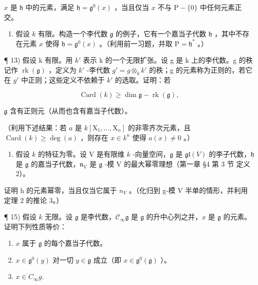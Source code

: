 \(x\) 是 \(\mathfrak{h}\) 中的元素，满足 \(\mathfrak{h} = \mathfrak{g}^0(x)\) ，当且仅当 \(x\) 不与 \(\mathrm{P} - \{0\}\) 中任何元素正交。

\begin{enumerate}
\def\labelenumi{\arabic{enumi})}
\setcounter{enumi}{11}
\tightlist
\item
  假设 \(k\) 有限。构造一个李代数 \(\mathfrak{g}\) 的例子，它有一个嘉当子代数 \(\mathfrak{h}\) ，其中不存在元素 \(x\) 使得 \(\mathfrak{h} = \mathfrak{g}^0(x)\) 。（利用前一习题，并取 \(\mathrm{P} = \mathfrak{h}^*\) 。）
\end{enumerate}

¶ 13) 假设 k 有限。用 \(k'\) 表示 k 的一个无限扩张。设 g 是 k 上的李代数。g 的秩记作 \(\operatorname{rk}(\mathfrak{g})\) ，定义为 \(k'\) -李代数 \(g' = g \otimes_{k} k'\) 的秩；g 的元素称为正则的，若它在 \(g'\) 中正则；这些定义不依赖于 \(k'\) 的选取。证明：若

\[
\operatorname{Card} (k) \geq \dim \mathfrak {g} - \operatorname{rk} (\mathfrak {g}),
\]

\(\mathfrak{g}\) 含有正则元（从而也含有嘉当子代数）。

（利用下述结果：若 \(a\) 是 \(k[\mathrm{X}_1, \ldots, \mathrm{X}_n]\) 的非零齐次元素，且 \(\operatorname{Card}(k) \geq \deg(a)\) ，则存在 \(x \in k^n\) 使得 \(a(x) \neq 0\) 。）

\begin{enumerate}
\def\labelenumi{\arabic{enumi})}
\setcounter{enumi}{13}
\tightlist
\item
  假设 \(k\) 的特征为零。设 V 是有限维 \(k\) -向量空间，\(\mathfrak{g}\) 是 \(\mathfrak{gl}(V)\) 的李子代数，\(\mathfrak{h}\) 是 \(\mathfrak{g}\) 的嘉当子代数，\(\mathfrak{n}_{\mathrm{V}}\) 是 \(\mathfrak{g}\) -模 V 的最大幂零理想（第一章 §4 第 3 节 定义 2）。
\end{enumerate}

证明 h 的元素幂零，当且仅当它属于 \(n_{V}\) 。（化归到 g-模 V 半单的情形，并利用定理 2 的推论 3。）

¶ 15) 假设 \(k\) 无限。设 \(\mathfrak{g}\) 是李代数，\(\mathcal{C}_{\infty}\mathfrak{g}\) 是 \(\mathfrak{g}\) 的升中心列之并，\(x\) 是 \(\mathfrak{g}\) 的元素。证明下列性质等价：

\begin{enumerate}
\def\labelenumi{(\roman{enumi})}
\item
  \(x\) 属于 \(\mathfrak{g}\) 的每个嘉当子代数。
\item
  \(x\in \mathfrak{g}^0 (y)\) 对一切 \(y\in \mathfrak{g}\) 成立（即 \(x\in \mathfrak{g}^0 (\mathfrak{g})\) ）。
\item
  \(x \in C_{\infty}g.\)
\end{enumerate}

